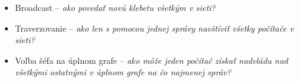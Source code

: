 


\begin{itemize}

    \item Broadcast -- \textit{ako povedať novú klebetu všetkým v sieti?}
    \item Traverzovanie -- \textit{ako len s pomocou jednej správy navštíviť všetky počítače v
    sieti?}
    \item Voľba šéfa na úplnom grafe -- \textit{ako môže jeden počítač získať nadvládu nad všetkými
    ostatnými v úplnom grafe na čo najmenej správ?}

\end{itemize}
    







